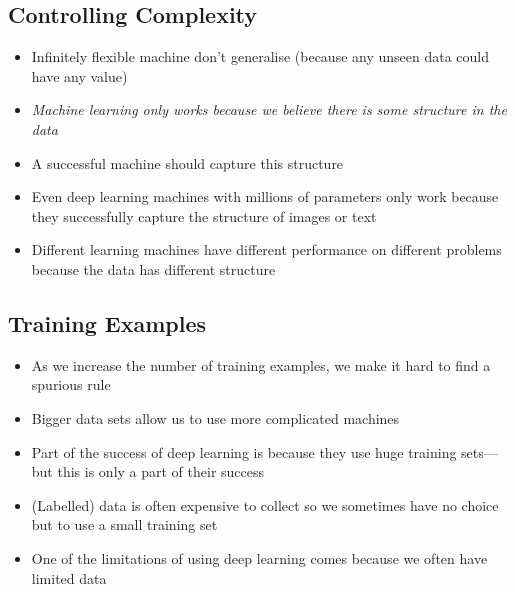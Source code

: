 \Outline %

\begin{slide}
\section{Controlling Complexity}

\begin{PauseHighLight}
  \begin{itemize}
  \item Infinitely flexible machine don't generalise\pause{} (because
    any unseen data could have any value)\pauseb
  \item \emph{Machine learning only works because we believe there is
      some structure in the data}\pause
  \item A successful machine should capture this structure\pause
  \item Even deep learning machines with millions of parameters only
    work because they successfully capture the structure of images or
    text\pause
  \item Different learning machines have different performance on
    different problems because the data has different structure\pause
  \end{itemize}
\end{PauseHighLight}

\end{slide}




\begin{slide}
\section{Training Examples}

\begin{PauseHighLight}
  \begin{itemize}
  \item As we increase the number of training examples, we make it hard
    to find a spurious rule\pause
  \item Bigger data sets allow us to use more complicated
    machines\pause
  \item Part of the success of deep learning is because they use huge
    training sets\pause---but this is only a part of their success\pauseb
  \item (Labelled) data is often expensive to collect so we
    sometimes have no choice but to use a small training set\pause
  \item One of the limitations of using deep learning comes because we often
    have limited data\pause
  \end{itemize}
\end{PauseHighLight}

\end{slide}


